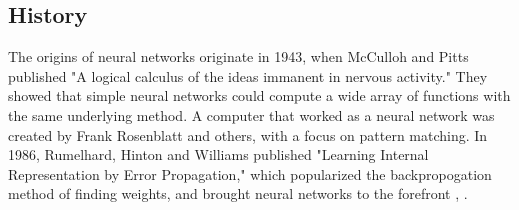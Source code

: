 \documentclass[12pt]{ucthesis}
\begin{document}



\subsection{History}
\label{History}

The origins of neural networks originate in 1943, when McCulloh and Pitts published "A logical calculus of the ideas immanent in nervous activity." They showed that simple neural networks could compute a wide array of functions with the same underlying method. A computer that worked as a neural network was created by Frank Rosenblatt and others, with a focus on pattern matching. In 1986, Rumelhard, Hinton and Williams published "Learning Internal Representation by Error Propagation," which popularized the backpropogation method of finding weights, and brought neural networks to the forefront \cite{BackpropHist}, \cite{yadav_2015}.
\end{document}
